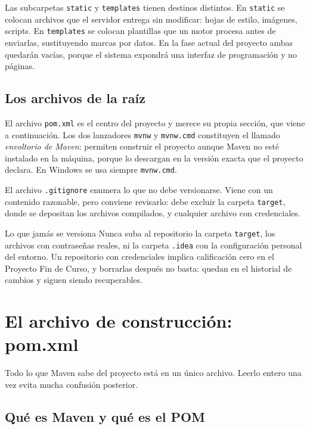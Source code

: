 \documentclass[11pt,a4paper,openany]{book}
\begin{document}
Las subcarpetas \texttt{static} y \texttt{templates} tienen destinos distintos. En \texttt{static} se colocan archivos que el servidor entrega sin modificar: hojas de estilo, imágenes, scripts. En \texttt{templates} se colocan plantillas que un motor procesa antes de enviarlas, sustituyendo marcas por datos. En la fase actual del proyecto ambas quedarán vacías, porque el sistema expondrá una interfaz de programación y no páginas.

\subsection{Los archivos de la raíz}
\label{sec:archivos-raiz}

El archivo \texttt{pom.xml} es el centro del proyecto y merece su propia sección, que viene a continuación. Los dos lanzadores \texttt{mvnw} y \texttt{mvnw.cmd} constituyen el llamado \emph{envoltorio de Maven}: permiten construir el proyecto aunque Maven no esté instalado en la máquina, porque lo descargan en la versión exacta que el proyecto declara. En Windows se usa siempre \texttt{mvnw.cmd}.

El archivo \texttt{.gitignore} enumera lo que no debe versionarse. Viene con un contenido razonable, pero conviene revisarlo: debe excluir la carpeta \texttt{target}, donde se depositan los archivos compilados, y cualquier archivo con credenciales.

\begin{cajaadvertencia}{Lo que jamás se versiona}
	Nunca suba al repositorio la carpeta \texttt{target}, los archivos con contraseñas reales, ni la carpeta \texttt{.idea} con la configuración personal del entorno. Un repositorio con credenciales implica calificación cero en el Proyecto Fin de Curso, y borrarlas después no basta: quedan en el historial de cambios y siguen siendo recuperables.
\end{cajaadvertencia}

\section{El archivo de construcción: pom.xml}
\label{sec:pom}

Todo lo que Maven sabe del proyecto está en un único archivo. Leerlo entero una vez evita mucha confusión posterior.

\subsection{Qué es Maven y qué es el POM}
\label{sec:maven}
\end{document}
